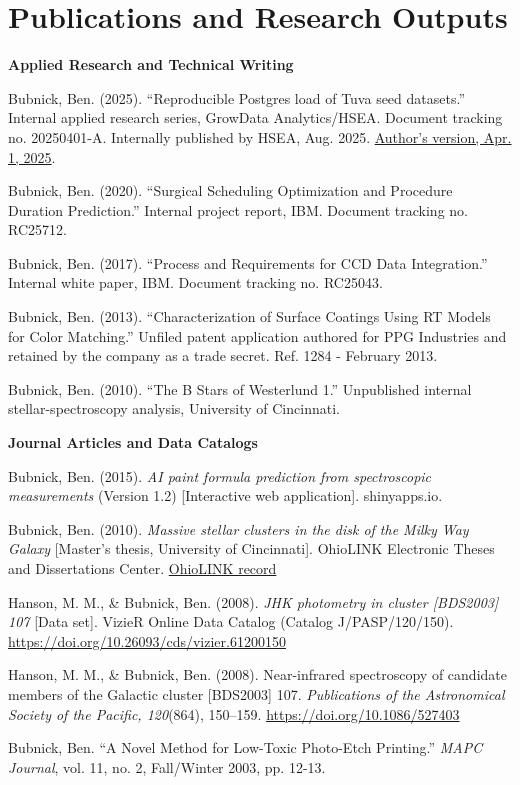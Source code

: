 \section{Publications and Research Outputs}
\label{sec:publications_and_research_outputs}
\begingroup
\raggedright

\textbf{Applied Research and Technical Writing}\par
Bubnick, Ben. (2025). ``Reproducible Postgres load of Tuva seed datasets.'' Internal applied research series, GrowData Analytics/HSEA. Document tracking no. 20250401-A. Internally published by HSEA, Aug. 2025. \href{https://github.com/bubnicbf/tuva-postgres/blob/dev/report.pdf}{Author's version, Apr. 1, 2025}.\par
Bubnick, Ben. (2020). ``Surgical Scheduling Optimization and Procedure Duration Prediction.'' Internal project report, IBM. Document tracking no. RC25712.\par
Bubnick, Ben. (2017). ``Process and Requirements for CCD Data Integration.'' Internal white paper, IBM. Document tracking no. RC25043.\par
Bubnick, Ben. (2013). ``Characterization of Surface Coatings Using RT Models for Color Matching.'' Unfiled patent application authored for PPG Industries and retained by the company as a trade secret. Ref. 1284 - February 2013.\par
Bubnick, Ben. (2010). ``The B Stars of Westerlund 1.'' Unpublished internal stellar-spectroscopy analysis, University of Cincinnati.

\smallskip
\textbf{Journal Articles and Data Catalogs}\par
Bubnick, Ben. (2015). \textit{AI paint formula prediction from spectroscopic measurements} (Version 1.2) [Interactive web application]. shinyapps.io.\par
Bubnick, Ben. (2010). \textit{Massive stellar clusters in the disk of the Milky Way Galaxy} [Master's thesis, University of Cincinnati]. OhioLINK Electronic Theses and Dissertations Center. \href{https://etd.ohiolink.edu/acprod/odb_etd/ws/send_file/send?accession=ucin1288378106\&disposition=inline}{OhioLINK record}\par
Hanson, M. M., \& Bubnick, Ben. (2008). \textit{JHK photometry in cluster [BDS2003] 107} [Data set]. VizieR Online Data Catalog (Catalog J/PASP/120/150). \url{https://doi.org/10.26093/cds/vizier.61200150}\par
Hanson, M. M., \& Bubnick, Ben. (2008). Near-infrared spectroscopy of candidate members of the Galactic cluster [BDS2003] 107. \textit{Publications of the Astronomical Society of the Pacific, 120}(864), 150--159. \linebreak\mbox{\href{https://doi.org/10.1086/527403}{https://doi.org/10.1086/527403}}\par
Bubnick, Ben. ``A Novel Method for Low-Toxic Photo-Etch Printing.'' \textit{MAPC Journal}, vol. 11, no. 2, Fall/Winter 2003, pp. 12-13.
\par
\endgroup
